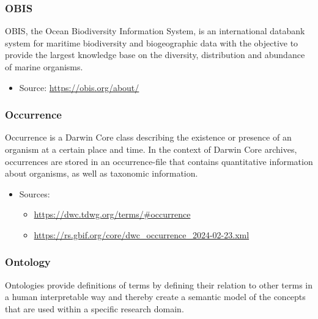 \documentclass[
]{book}
\providecommand{\tightlist}{%
  \setlength{\itemsep}{0pt}\setlength{\parskip}{0pt}}
\begin{document}
\hypertarget{OBIS}{%
\subsubsection*{OBIS}\label{OBIS}}

OBIS, the Ocean Biodiversity Information System, is an international databank system for maritime biodiversity and biogeographic data with the objective to provide the largest knowledge base on the diversity, distribution and abundance of marine organisms.

\begin{itemize}
\tightlist
\item
  Source: \url{https://obis.org/about/}
\end{itemize}

\hypertarget{occurrence}{%
\subsubsection*{Occurrence}\label{occurrence}}

Occurrence is a Darwin Core class describing the existence or presence of an organism at a certain place and time. In the context of Darwin Core archives, occurrences are stored in an occurrence-file that contains quantitative information about organisms, as well as taxonomic information.

\begin{itemize}
\tightlist
\item
  Sources:

  \begin{itemize}
  \tightlist
  \item
    \url{https://dwc.tdwg.org/terms/\#occurrence}
  \item
    \url{https://rs.gbif.org/core/dwc_occurrence_2024-02-23.xml}
  \end{itemize}
\end{itemize}

\hypertarget{ontology}{%
\subsubsection*{Ontology}\label{ontology}}

Ontologies provide definitions of terms by defining their relation to other terms in a human interpretable way and thereby create a semantic model of the concepts that are used within a specific research domain.
\end{document}
